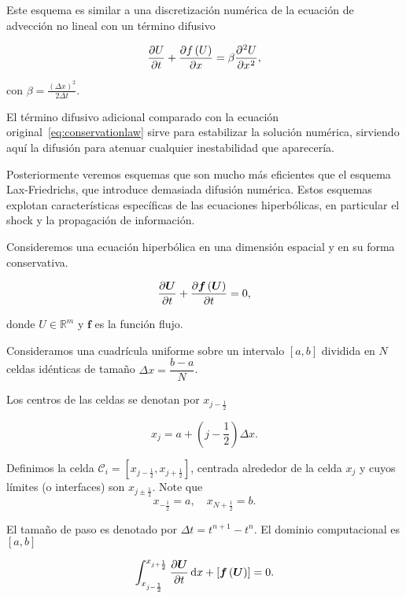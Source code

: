 \begin{frame}
	Este esquema es similar a una discretización numérica de la ecuación
	de advección no lineal con un término difusivo

	\begin{equation*}
		\diffp{U}{t}+
		\diffp{f\left(U\right)}{x}=
		\beta
		\diffp[2]{U}{x},
	\end{equation*}

	con
	\begin{math}
		\beta=
		\frac{{\left(\Delta x\right)}^{2}}{2\Delta t}
	\end{math}.

	El término difusivo adicional comparado con la ecuación
	original~\eqref{eq:conservationlaw} sirve para estabilizar la
	solución numérica, sirviendo aquí la difusión para atenuar cualquier
	inestabilidad que aparecería.

	Posteriormente veremos esquemas que son mucho más eficientes que el
	esquema Lax-Friedrichs, que introduce demasiada difusión numérica.
	Estos esquemas explotan características específicas de las ecuaciones
	hiperbólicas, en particular el shock y la propagación de información.

	Consideremos una ecuación hiperbólica en una dimensión espacial y en
	su forma conservativa.

	\begin{equation}\label{eq:hyperbolic1d}
		\diffp{\bm{U}}{t}+
		\diffp{\bm{f}\left(\bm{U}\right)}{t}=
		0,
	\end{equation}

	donde $U\in\mathbb{R}^{m}$ y $\bm{f}$ es la función flujo.

	Consideramos una cuadrícula uniforme sobre un intervalo
	$\left[a,b\right]$ dividida en $N$ celdas idénticas de tamaño
	\begin{math}
		\Delta x=
		\dfrac{b-a}{N}
	\end{math}.

	Los centros de las celdas se denotan por $x_{j-\frac{1}{2}}$

	\begin{equation*}
		x_{j}=
		a+
		\left(
		j-
		\frac{1}{2}
		\right)
		\Delta x.
	\end{equation*}

	Definimos la celda
	\begin{math}
		\mathcal{C}_{i}=
		\left[
			x_{j-\frac{1}{2}},
			x_{j+\frac{1}{2}}
			\right]
	\end{math},
	centrada alrededor de la celda $x_{j}$ y cuyos límites (o interfaces)
	son $x_{j\pm\frac{1}{2}}$.
	Note que
	\begin{equation*}
		x_{-\frac{1}{2}}=
		a,
		\quad
		x_{N+\frac{1}{2}}=
		b.
	\end{equation*}

	El tamaño de paso es denotado por $\Delta t=t^{n+1}-t^{n}$.
	El dominio computacional es $\left[a,b\right]$

	\begin{equation*}
		\int_{
			x_{j-\frac{1}{2}}
		}^{
			x_{j+\frac{1}{2}}
		}
		\diffp{\bm{U}}{t}
		\dl x+
		\left[
			\bm{f}
			\left(\bm{U}\right)
			\right]
		=0.
	\end{equation*}
\end{frame}

